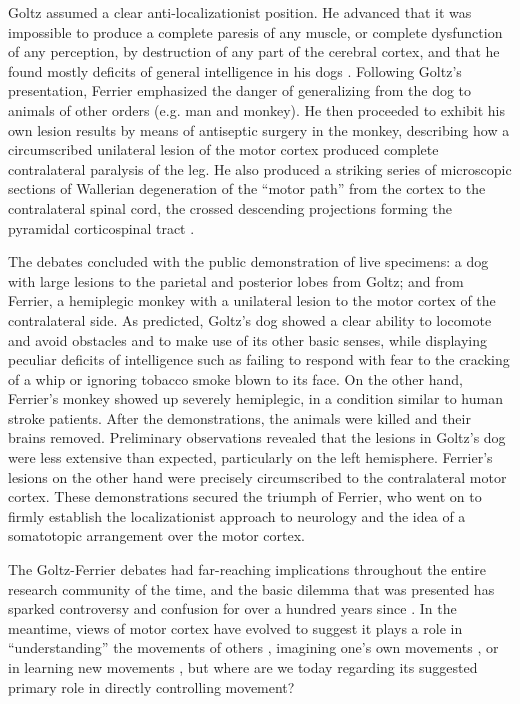 Goltz assumed a clear anti-localizationist position. He advanced that it was impossible to produce a complete paresis of any muscle, or complete dysfunction of any perception, by destruction of any part of the cerebral cortex, and that he found mostly deficits of general intelligence in his dogs \cite{Tyler2000}. Following Goltz's presentation, Ferrier emphasized the danger of generalizing from the dog to animals of other orders (e.g. man and monkey). He then proceeded to exhibit his own lesion results by means of antiseptic surgery in the monkey, describing how a circumscribed unilateral lesion of the motor cortex produced complete contralateral paralysis of the leg. He also produced a striking series of microscopic sections of Wallerian degeneration \cite{Waller1850} of the ``motor path'' from the cortex to the contralateral spinal cord, the crossed descending projections forming the pyramidal corticospinal tract \cite{Tyler2000}.

The debates concluded with the public demonstration of live specimens: a dog with large lesions to the parietal and posterior lobes from Goltz; and from Ferrier, a hemiplegic monkey with a unilateral lesion to the motor cortex of the contralateral side. As predicted, Goltz's dog showed a clear ability to locomote and avoid obstacles and to make use of its other basic senses, while displaying peculiar deficits of intelligence such as failing to respond with fear to the cracking of a whip or ignoring tobacco smoke blown to its face. On the other hand, Ferrier's monkey showed up severely hemiplegic, in a condition similar to human stroke patients. After the demonstrations, the animals were killed and their brains removed. Preliminary observations revealed that the lesions in Goltz's dog were less extensive than expected, particularly on the left hemisphere. Ferrier's lesions on the other hand were precisely circumscribed to the contralateral motor cortex. These demonstrations secured the triumph of Ferrier, who went on to firmly establish the localizationist approach to neurology and the idea of a somatotopic arrangement over the motor cortex.

The Goltz-Ferrier debates had far-reaching implications throughout the entire research community of the time, and the basic dilemma that was presented has sparked controversy and confusion for over a hundred years since \cite{Phillips1984,Lashley1924,DeBarenne1933,Tyler2000,Gross2007}. In the meantime, views of motor cortex have evolved to suggest it plays a role in ``understanding'' the movements of others \cite{Rizzolatti2004}, imagining one's own movements \cite{Porro1996}, or in learning new movements \cite{Kawai2015}, but where are we today regarding its suggested primary role in directly controlling movement?

